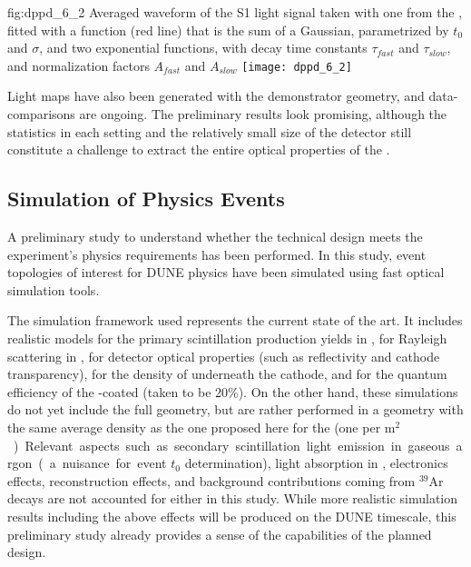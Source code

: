 \begin{dunefigure}{fig:dppd_6_2}
{Averaged waveform of the S1 light signal taken with one  from the  , fitted with a function (red line) that is the sum of a Gaussian, parametrized by $t_0$ and $\sigma$, and two exponential functions, with decay time constants $\tau_{fast}$ and $\tau_{slow}$, and normalization factors $A_{fast}$ and $A_{slow}$}
\texttt{[image: dppd\_6\_2]}
\end{dunefigure}

Light maps have also been generated with the demonstrator geometry, and data- comparisons are ongoing. The preliminary results look promising, although the statistics in each setting and the relatively small size of the detector still constitute a challenge to extract the entire optical properties of the \lar.


\subsection{Simulation of Physics Events}
\label{sec:fddp-pd-6.3}

A preliminary study to understand whether the \dual {} technical design meets the experiment's physics requirements has been performed. In this study, event topologies of interest for DUNE physics have been simulated using \larsoft fast optical simulation tools.

The simulation framework used represents the current state of the art. It includes realistic models for the primary scintillation production yields in \lar, for Rayleigh scattering in \lar, for detector optical properties (such as  reflectivity and cathode transparency), for the density of  underneath the cathode, and for the quantum efficiency of the -coated  (taken to be \num{20}\%). On the other hand, these simulations do not yet include the full  geometry, but are rather performed in a  geometry with the same average  density as the one proposed here for the  (one  per \si{m$^2$}). Relevant aspects such as secondary scintillation light emission in gaseous argon (a nuisance for event $t_0$ determination), light absorption in \lar, electronics effects, reconstruction effects, and background contributions coming from $^{39}$Ar decays are not accounted for either in this study. While more realistic simulation results including the above effects will be produced on the DUNE  timescale, this preliminary study already provides a sense of the capabilities of the planned  design.

